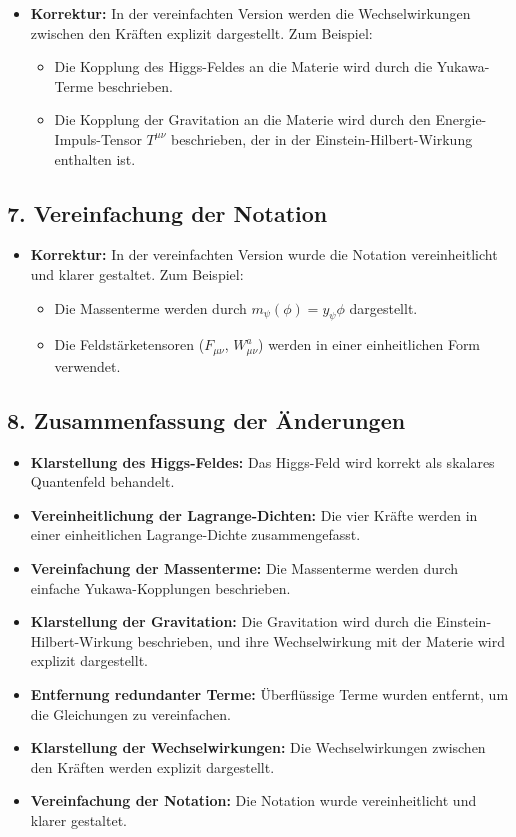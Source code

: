 \documentclass{article}
\begin{document}
	\begin{itemize}
		\item \textbf{Korrektur:} In der vereinfachten Version werden die Wechselwirkungen zwischen den Kräften explizit dargestellt. Zum Beispiel:
		\begin{itemize}
			\item Die Kopplung des Higgs-Feldes an die Materie wird durch die Yukawa-Terme beschrieben.
			\item Die Kopplung der Gravitation an die Materie wird durch den Energie-Impuls-Tensor $T^{\mu\nu}$ beschrieben, der in der Einstein-Hilbert-Wirkung enthalten ist.
		\end{itemize}
	\end{itemize}
	
	\subsection{7. Vereinfachung der Notation}
	
	\begin{itemize}
		\item \textbf{Korrektur:} In der vereinfachten Version wurde die Notation vereinheitlicht und klarer gestaltet. Zum Beispiel:
		\begin{itemize}
			\item Die Massenterme werden durch $m_\psi(\phi) = y_\psi \phi$ dargestellt.
			\item Die Feldstärketensoren ($F_{\mu\nu}$, $W_{\mu\nu}^a$) werden in einer einheitlichen Form verwendet.
		\end{itemize}
	\end{itemize}
	
	\subsection{8. Zusammenfassung der Änderungen}
	
	\begin{itemize}
		\item \textbf{Klarstellung des Higgs-Feldes:} Das Higgs-Feld wird korrekt als skalares Quantenfeld behandelt.
		\item \textbf{Vereinheitlichung der Lagrange-Dichten:} Die vier Kräfte werden in einer einheitlichen Lagrange-Dichte zusammengefasst.
		\item \textbf{Vereinfachung der Massenterme:} Die Massenterme werden durch einfache Yukawa-Kopplungen beschrieben.
		\item \textbf{Klarstellung der Gravitation:} Die Gravitation wird durch die Einstein-Hilbert-Wirkung beschrieben, und ihre Wechselwirkung mit der Materie wird explizit dargestellt.
		\item \textbf{Entfernung redundanter Terme:} Überflüssige Terme wurden entfernt, um die Gleichungen zu vereinfachen.
		\item \textbf{Klarstellung der Wechselwirkungen:} Die Wechselwirkungen zwischen den Kräften werden explizit dargestellt.
		\item \textbf{Vereinfachung der Notation:} Die Notation wurde vereinheitlicht und klarer gestaltet.
	\end{itemize}
	
\end{document}
